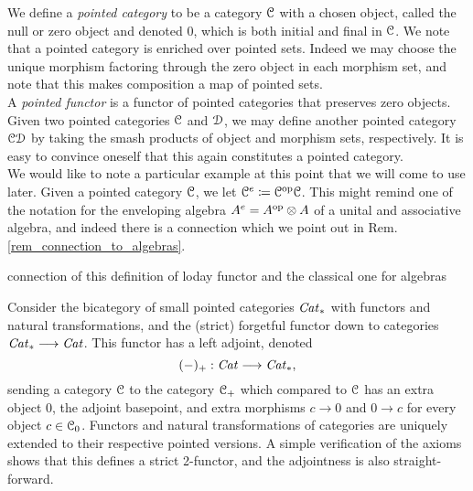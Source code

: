   \begin{defn}\label{def_pointed_stuff}
    We define a \emph{pointed category} to be a category $\mathcal{C}$ with a chosen object, called the null or zero object and denoted $0$, which is both initial and final in $\mathcal{C}$. We note that a pointed category is enriched over pointed sets. Indeed we may choose the unique morphism factoring through the zero object in each morphism set, and note that this makes composition a map of pointed sets.\\
    A \emph{pointed functor} is a functor of pointed categories that preserves zero objects.\\
    Given two pointed categories $\mathcal{C}$ and $\mathcal{D}$, we may define another pointed category $\mathcal{C} \smash {\mathcal{D}}$ by taking the smash products of object and morphism sets, respectively. It is easy to convince oneself that this again constitutes a pointed category.\\
    We would like to note a particular example at this point that we will come to use later. Given a pointed category $\mathcal{C}$, we let $\mathcal{C}^e \coloneqq \mathcal{C}^{\mathrm{op}} \smash {\mathcal{C}}$. This might remind one of the notation for the enveloping algebra $A^{e} = A^{\mathrm{op}} \otimes A$ of a unital and associative algebra, and indeed there is a connection which we point out in Rem. \ref{rem_connection_to_algebras}.
  \end{defn}

  \begin{rem}\label{rem_connection_to_algebras}
  connection of this definition of loday functor and the classical one for algebras
  \end{rem}

  \begin{defn}\label{def_added_basepoint_extending_functor}
    Consider the bicategory of small pointed categories $\mathit{Cat}_*$ with functors and natural transformations, and the (strict) forgetful functor down to categories $\mathit{Cat}_* \longrightarrow \mathit{Cat}$. This functor has a left adjoint, denoted
    \begin{displaymath}
      (-)_+ : \mathit{Cat} \longrightarrow \mathit{Cat}_*,
    \end{displaymath}
    sending a category $\mathcal{C}$ to the category $\mathcal{C}_+$ which compared to $\mathcal{C}$ has an extra object $0$, the adjoint basepoint, and extra morphisms $c \to 0$ and $0 \to c$ for every object $c \in \mathcal{C}_0$. Functors and natural transformations of categories are uniquely extended to their respective pointed versions. A simple verification of the axioms shows that this defines a strict 2-functor, and the adjointness is also straight-forward.
  \end{defn}


